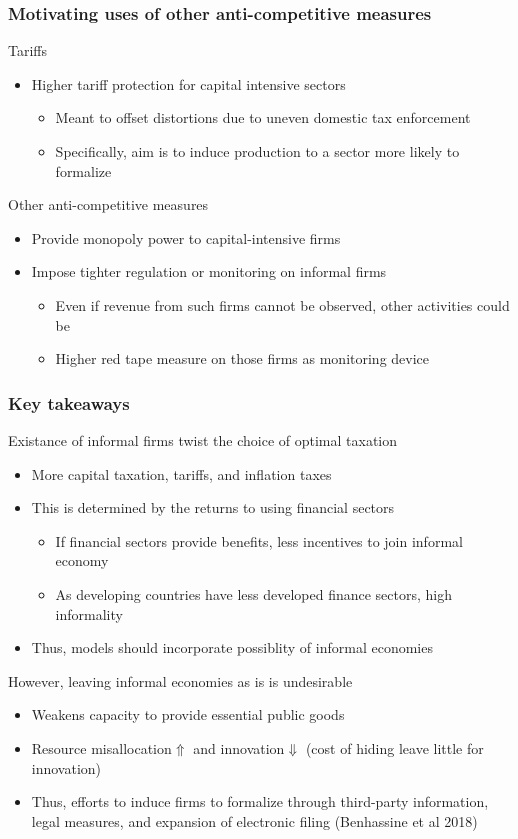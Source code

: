 \documentclass[aspectratio=169]{beamer}
\begin{document}
\begin{frame}
\frametitle{Motivating uses of other anti-competitive measures}
Tariffs  
\begin{itemize}\setlength\itemsep{3pt}
\item Higher tariff protection for capital intensive sectors
\begin{itemize}\setlength\itemsep{3pt}
\item Meant to offset distortions due to uneven domestic tax enforcement
\item Specifically, aim is to induce production to a sector more likely to formalize
\end{itemize}
\end{itemize}\medskip
Other anti-competitive measures
\begin{itemize}\setlength\itemsep{3pt}
\item Provide monopoly power to capital-intensive firms
\item Impose tighter regulation or monitoring on informal firms
\begin{itemize}\setlength\itemsep{3pt}
\item Even if revenue from such firms cannot be observed, other activities could be
\item Higher red tape measure on those firms as monitoring device
\end{itemize}
\end{itemize}\medskip
\end{frame}

\begin{frame}
\frametitle{Key takeaways}
Existance of informal firms twist the choice of optimal taxation 
\begin{itemize}\setlength\itemsep{3pt}
\item More capital taxation, tariffs, and inflation taxes
\item This is determined by the returns to using financial sectors
\begin{itemize}\setlength\itemsep{3pt}
\item If financial sectors provide benefits, less incentives to join informal economy
\item As developing countries have less developed finance sectors, high informality
\end{itemize}
\item Thus, models should incorporate possiblity of informal economies
\end{itemize}\medskip
However, leaving informal economies as is is undesirable
\begin{itemize}\setlength\itemsep{3pt}
\item Weakens capacity to provide essential public goods
\item Resource misallocation$\Uparrow$ and innovation$\Downarrow$ (cost of hiding leave little for innovation)
\item Thus, efforts to induce firms to formalize through third-party information, legal measures, and expansion of electronic filing (Benhassine et al 2018)
\end{itemize}
\end{frame}
\end{document}
